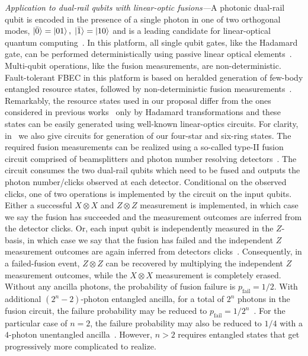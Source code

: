\documentclass[reprint,
groupedaddress,
 prl,amsmath,amssymb,
 aps]{revtex4-2}
\theoremstyle{definition}
\begin{document}
\begin{bibunit}
{\it Application to dual-rail qubits with linear-optic fusions---}A photonic dual-rail qubit is encoded in the presence of a single photon in one of two orthogonal modes, $\ket{\bar{0}}=\ket{01},\;\ket{\bar{1}}=\ket{10}$ and is a leading candidate for linear-optical quantum computing~\cite{knill2001scheme,nielsen2004optical,browne2005resource,kok2007linear}. In this platform, all single qubit gates, like the Hadamard gate, can be performed deterministically using passive linear optical elements~\cite{politi2009integrated}. Multi-qubit operations, like the fusion measurements, are non-deterministic. Fault-tolerant FBEC in this platform is based on heralded generation of few-body entangled resource states, followed by non-deterministic fusion measurements~\cite{li2015resource,bartolucci2021fusion}.
Remarkably, the resource states used in our proposal differ from the ones considered in previous works~\cite{bartolucci2021fusion} only by Hadamard transformations and these states can be easily generated using well-known linear-optics circuits. For clarity, in~\cite{supplement} we also give circuits for generation of our four-star and six-ring states. The required fusion measurements can be realized using a so-called type-II fusion circuit comprised of beamsplitters and photon number resolving detectors~\cite{browne2005resource,gilchrist2007efficient}. The circuit consumes the two dual-rail qubits which need to be fused and outputs the photon number/clicks observed at each detector. Conditional on the observed clicks, one of two operations is implemented by the circuit on the input qubits. Either a successful $X\otimes X$ and $Z\otimes Z$ measurement is implemented, in which case we say the fusion has succeeded and the measurement outcomes {are} inferred from the detector clicks. Or, each input qubit is independently measured in the $Z$-basis, in which case we say that the fusion has failed and the independent $Z$ measurement outcomes {are} again inferred from detectors clicks~\cite{bartolucci2021fusion,supplement}. Consequently, in a failed-fusion event, $Z\otimes Z$ can be recovered by multiplying the independent $Z$ measurement outcomes, while the $X\otimes X$ measurement is completely erased. Without any ancilla photons, the probability of fusion failure is $p_\mathrm{fail}=1/2$. With additional $(2^n-2)$-photon entangled ancilla, for a total of $2^n$ photons in the fusion circuit, the failure probability may be reduced to $p_\mathrm{fail}=1/2^n$~\cite{grice2011arbitrarily}. For the particular case of $n=2$, the failure probability may also be reduced to $1/4$ with a $4$-photon unentangled ancilla~\cite{ewert20143}. However, $n>2$ requires entangled states that get progressively more complicated to realize. 


\end{bibunit}
\end{document}

